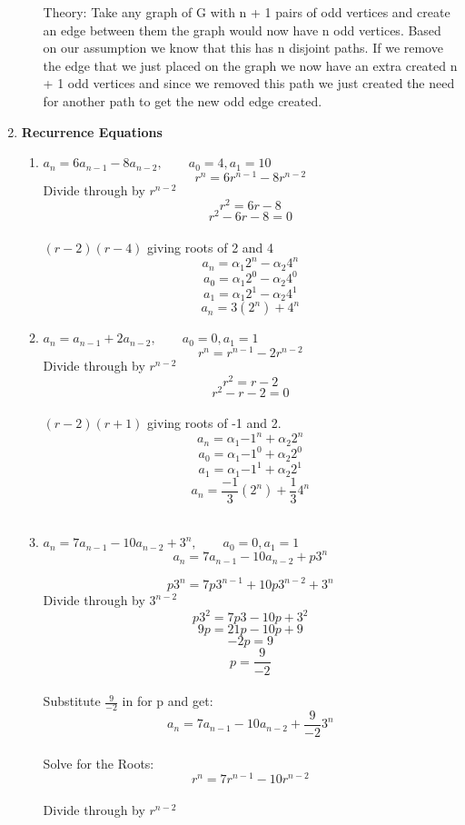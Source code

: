 \documentclass[12pt]{amsart}
\newcommand{\fr}[2]{\frac{#1}{#2}}
\begin{document}
\begin{enumerate}
\begin{enumerate}
    Theory: Take any graph of G with n + 1 pairs of odd vertices and
create an edge between them the graph would now have n odd
vertices.  Based on our assumption we know that this has n
disjoint paths.  If we remove the edge that we just placed on the
graph we now have an extra created n + 1 odd vertices and since we
removed this path we just created the need for another path to get
the new odd edge created.\\
\end{enumerate}






\item{\bf Recurrence Equations}\\
\begin{enumerate}
\item
$a_n = 6a_{n-1} - 8a_{n-2}, \qquad a_0 = 4, a_1 = 10$
$$ r^n = 6r^{n-1} - 8r^{n-2}$$
Divide through by $r^{n-2}$
$$ r^2 = 6r - 8$$
$$ r^2 - 6r - 8 = 0$$\\
$ (r - 2)(r - 4) $ giving roots of 2 and 4\\
$$ a_n = \alpha_1{2^n} - \alpha_2{4^n}$$
$$ a_0 = \alpha_1{2^0} - \alpha_2{4^0}$$
$$ a_1 = \alpha_1{2^1} - \alpha_2{4^1}$$
$$ a_n = 3({2^n}) + {4^n}$$

\item
$a_n = a_{n-1} + 2a_{n-2}, \qquad a_0 = 0, a_1 = 1$
$$ r^n = r^{n-1} - 2r^{n-2}$$
Divide through by $r^{n-2}$
$$ r^2 = r - 2$$
$$ r^2 - r - 2 = 0$$\\
$ (r - 2)(r + 1) $ giving roots of -1 and 2.\\
$$ a_n = \alpha_1{-1^n} + \alpha_2{2^n}$$
$$ a_0 = \alpha_1{-1^0} + \alpha_2{2^0}$$
$$ a_1 = \alpha_1{-1^1} + \alpha_2{2^1}$$
$$ a_n = \fr{-1}{3}({2^n}) + \fr{1}{3}{4^n}$$\\

\item
$a_n = 7a_{n-1} - 10a_{n-2} + 3^n, \qquad a_0 = 0, a_1 = 1$
$$a_n = 7a_{n-1} - 10a_{n-2} + p3^n$$

$$p3^n = 7p3^{n-1} + 10p3^{n-2} + 3^n$$
Divide through by $3^{n-2}$
$$p3^2 = 7p3 - 10p + 3^2$$
$$9p = 21p - 10p + 9$$
$$-2p = 9$$
$$ p = \fr{9}{-2}$$
\\

Substitute $\fr{9}{-2}$ in for p and get:
$$a_n = 7a_{n-1} - 10a_{n-2} + \fr{9}{-2}3^n$$
\\Solve for the Roots:\\
$$ r^n = 7r^{n-1} - 10r^{n-2}$$\\
Divide through by $r^{n-2}$
\\


\end{enumerate}
\end{enumerate}
\end{document}
